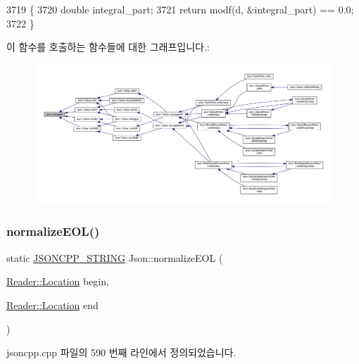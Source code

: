 \begin{DoxyCode}
3719                                  \{
3720   \textcolor{keywordtype}{double} integral\_part;
3721   \textcolor{keywordflow}{return} modf(d, &integral\_part) == 0.0;
3722 \}
\end{DoxyCode}
이 함수를 호출하는 함수들에 대한 그래프입니다.\+:\nopagebreak
\begin{figure}[H]
\begin{center}
\leavevmode
\includegraphics[width=350pt]{namespace_json_a1a04cc9d31e64b5912dade003c9b99b5_icgraph}
\end{center}
\end{figure}
\mbox{\label{namespace_json_a63123f3dd63f340ac517a59f44ea7aa4}} 
\subsubsection{\texorpdfstring{normalize\+E\+O\+L()}{normalizeEOL()}}
{\footnotesize\ttfamily static \hyperlink{json_8h_a1e723f95759de062585bc4a8fd3fa4be}{J\+S\+O\+N\+C\+P\+P\+\_\+\+S\+T\+R\+I\+NG} Json\+::normalize\+E\+OL (\begin{DoxyParamCaption}\item[{\hyperlink{class_json_1_1_reader_a46795b5b272bf79a7730e406cb96375a}{Reader\+::\+Location}}]{begin,  }\item[{\hyperlink{class_json_1_1_reader_a46795b5b272bf79a7730e406cb96375a}{Reader\+::\+Location}}]{end }\end{DoxyParamCaption})\hspace{0.3cm}{\ttfamily [static]}}



jsoncpp.\+cpp 파일의 590 번째 라인에서 정의되었습니다.



